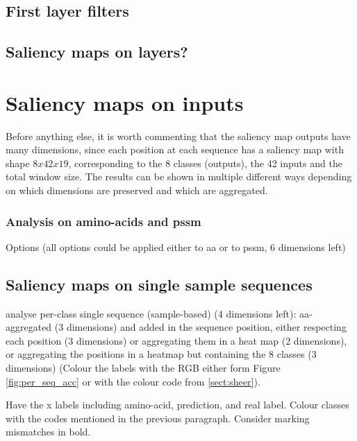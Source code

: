 	\subsection{First layer filters}
	
	\subsection{Saliency maps on layers?}


\section{Saliency maps on inputs}

Before anything else, it is worth commenting that the saliency map outputs have many dimensions, since each position at each sequence has a saliency map with shape $8x42x19$, corresponding to the 8 classes (outputs), the 42 inputs and the total window size. The results can be shown in multiple different ways depending on which dimensions are preserved and which are aggregated. 


\subsubsection*{Analysis on amino-acids and pssm}


Options (all options could be applied either to aa or to pssm, 6 dimensions left)
	
	\subsection{Saliency maps on single sample sequences}
	analyse per-class single sequence (sample-based) (4 dimensions left): aa-aggregated (3 dimensions) and added in the sequence position, either respecting each position (3 dimensions) or aggregating them in a heat map (2 dimensions), or aggregating the positions in a heatmap but containing the 8 classes (3 dimensions) (Colour the labels with the RGB either form Figure \ref{fig:per_seq_acc} or with the colour code from \ref{sect:sheer}).
	
	Have the x labels including amino-acid, prediction, and real label. Colour classes with the codes mentioned in the previous paragraph. Consider marking mismatches in bold.
	
